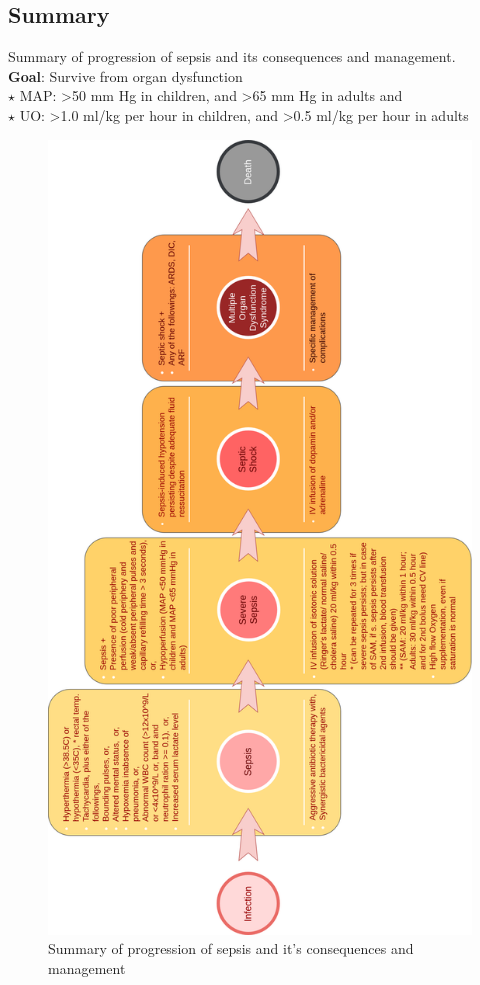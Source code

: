 \documentclass[11pt,a4paper]{report}
\begin{document}
\subsection{Summary}
Summary of progression of sepsis and its consequences and management.\\
\textbf{Goal}: Survive from organ dysfunction \\
\textbf{$\star$} MAP: \textgreater50 mm Hg in children, and \textgreater65 mm Hg in adults and  \\
\textbf{$\star$} UO: \textgreater1.0 ml/kg per hour in children, and \textgreater0.5 ml/kg per hour in adults \\


\begin{figure}[htp]
	\centering \includegraphics[scale=0.21]{sepsis_cascades.png}
	\centering \caption[Summary of sepsis]{Summary of progression of sepsis and it's consequences and management}
	\label{Sepsis}
\end{figure}
\end{document}
